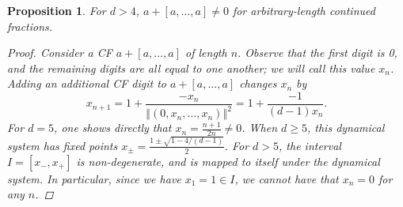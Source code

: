 \documentclass[reqno,10pt]{amsart}
\newcommand{\Norm}[1]{\left\Vert #1 \right \Vert}
\newtheorem{prop}[thm]{Proposition}
\numberwithin{thm}{section}
\theoremstyle{definition}
\theoremstyle{definition}
\numberwithin{equation}{section}
\begin{document}
\begin{prop}
For $d>4$, $a+[a,\ldots, a]\neq 0$ for arbitrary-length continued fractions.
\begin{proof}
Consider a CF $a+[a, \ldots, a]$ of length $n$. Observe that the first digit is 0, and the remaining digits are all equal to one another; we will call this value $x_n$.  Adding an additional CF digit to $a+[a,\ldots, a]$ changes $x_n$ by
$$x_{n+1}=1+\frac{-x_n}{\Norm{(0, x_n, \ldots, x_n)}^2}=1+\frac{-1}{(d-1)x_n}.$$
For $d=5$, one shows directly that $x_n=\frac{n+1}{2n}\neq 0$. When $d\geq 5$, this dynamical system has fixed points $x_\pm =\frac{1\pm \sqrt{1-4/(d-1)}}{2}$. For $d>5$, the interval $I=[x_-, x_+]$ is non-degenerate, and is mapped to itself under the dynamical system. In particular, since we have $x_1=1\in I$, we cannot have that $x_n=0$ for any $n$. 
\end{proof}
\end{prop}



\end{document}
